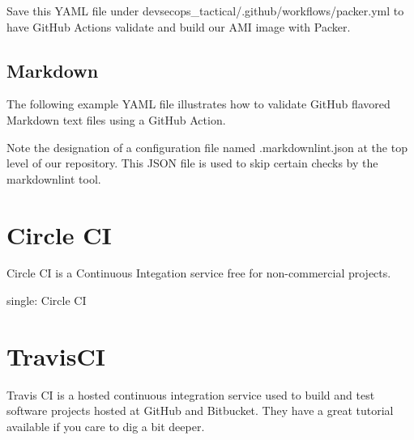 Save this YAML file under devsecops\_tactical/.github/workflows/packer.yml to have
GitHub Actions validate and build our AMI image with Packer.

%	

\subsection{Markdown}

The following example YAML file illustrates how to validate GitHub
flavored Markdown text files using a GitHub Action.

%	

\justify
Note the designation of a configuration file named .markdownlint.json at
the top level of our repository. This JSON file is used to skip certain
checks by the markdownlint tool.

\justify
%	

\section{Circle CI}

Circle CI is a Continuous Integation service free for non-commercial
projects.

single: Circle CI

\justify
%	 

\section{TravisCI}

\justify
Travis CI is a hosted continuous integration service used to build and
test software projects hosted at GitHub and Bitbucket. They have a great
tutorial available
if you care to dig a bit deeper.

